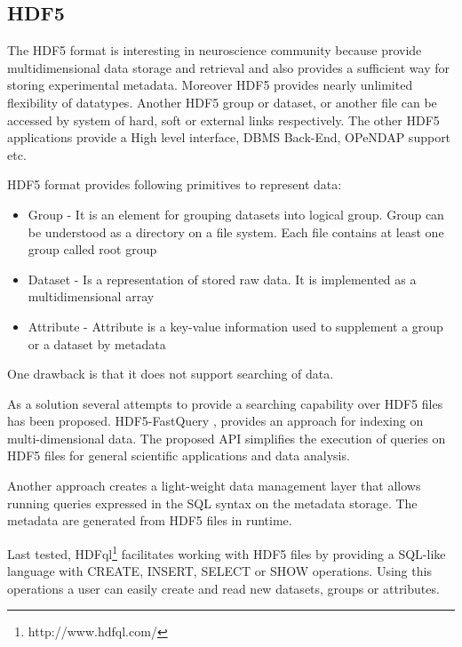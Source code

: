 \documentclass[utf8]{frontiersSCNS} %
\begin{document}
\subsection{HDF5}
\label{HDF5}

The HDF5 format is interesting in neuroscience community because provide multidimensional data storage and retrieval and also provides a sufficient way for storing experimental metadata. Moreover HDF5 provides nearly unlimited flexibility of datatypes. Another HDF5 group or dataset, or another file can be accessed by system of hard, soft or external links respectively. The other HDF5 applications \citep{Folk:2011:OHT:1966895.1966900} provide a High level interface, DBMS Back-End, OPeNDAP support etc.


HDF5 format \citep{Koziol2011} provides following primitives to represent data:

\begin{itemize}
 \item Group - It is an element for grouping datasets into logical group. Group can be understood as a directory on a file system. Each file contains at least one group called root group
 \item Dataset - Is a representation of stored raw data. It is implemented as a multidimensional array 
 \item Attribute - Attribute is a key-value information used to supplement a group or a dataset by metadata
\end{itemize}

One drawback is that it does not support searching of data.


As a solution several attempts to provide a searching capability over HDF5 files has been proposed. HDF5-FastQuery \citep{1644309}, \citep{6114446} provides an approach for indexing on multi-dimensional data. The proposed API simplifies the execution of queries on HDF5 files for general scientific applications and data analysis.

Another approach \citep{6546110} creates a light-weight data management layer that allows running queries expressed in the SQL syntax on the metadata storage. The metadata are generated from HDF5 files in runtime.

Last tested, HDFql\footnote{http://www.hdfql.com/} facilitates working with HDF5 files by providing a SQL-like language with CREATE, INSERT, SELECT or SHOW operations. Using this operations a user can easily create and read new datasets, groups or attributes. 
\end{document}
